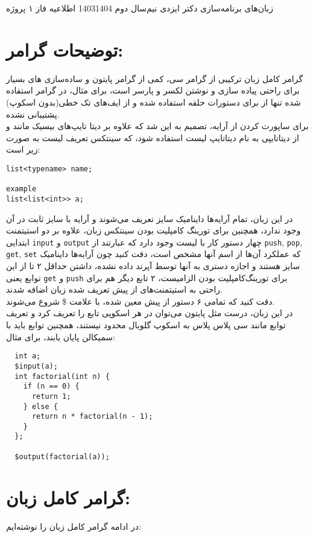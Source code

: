 \documentclass[a4paper,12pt]{article}
\begin{document}
\handout
{زبان‌های برنامه‌سازی}
{دکتر ایزدی}
{نیم‌سال دوم 1403\lr{-}1404}
{اطلاعیه}
{}
{}
{فاز ۱ پروژه}
\section{توضیحات گرامر:}
گرامر کامل زبان ترکیبی از گرامر سی، کمی از گرامر پایتون و ساده‌سازی های بسیار برای راحتی پیاده سازی و نوشتن لکسر و پارسر است، 
برای مثال، در گرامر استفاده شده تنها از 
برای دستورات حلقه استفاده شده و از ایف‌های تک خطی(بدون اسکوپ) پشتیبانی نشده.
\\
برای ساپورت کردن از آرایه، تصمیم به این شد که علاوه بر دیتا‌ تایپ‌های بیسیک مانند 
 و  از دیتاتایپی به نام دیتاتایپ لیست استفاده شود، 
که سینتکس تعریف لیست به صورت زیر است:
\begin{verbatim}
list<typename> name;

example
list<list<int>> a;
\end{verbatim}
در این زبان، تمام آرایه‌ها داینامیک سایز تعریف می‌شوند و آرایه با سایز ثابت در آن وجود ندارد، همچنین برای تورینگ کامپلیت بودن 
سینتکس زبان، علاوه بر دو استیتمنت ابتدایی 
\texttt{input}
و 
\texttt{output}
چهار دستور کار با لیست وجود دارد که عبارتند از
\texttt{push}, \texttt{pop}, \texttt{get}, \texttt{set}
که عملکرد آن‌ها از اسم آنها مشخص است، دقت کنید چون آرایه‌ها داینامیک سایز هستند 
و اجازه دستری به آنها توسط آپرند داده نشده، داشتن حداقل ۲ تا از این توابع یعنی 
\texttt{get}
و 
\texttt{push}
برای تورینگ‌کامپلیت بودن الزامیست، ۲ تابع دیگر هم برای راحتی به استیتمنت‌های از پیش تعریف شده زبان اضافه شدند.
\\
دقت کنید که تمامی ۶ دستور از پیش معین شده، با علامت 
\$
شروع می‌شوند.
\\
در این زبان، درست مثل پایتون می‌توان در هر اسکوپی تابع را تعریف کرد و تعریف توابع مانند سی پلاس پلاس به اسکوپ گلوبال محدود نیستند، همچنین توابع باید با سمیکالن 
پایان یابند، برای مثال:
\begin{verbatim}
  int a;
  $input(a);
  int factorial(int n) {
    if (n == 0) {
      return 1;
    } else {
      return n * factorial(n - 1);
    }
  };

  $output(factorial(a));
\end{verbatim}
\pagebreak
\section{گرامر کامل زبان:}
در ادامه گرامر کامل زبان را نوشته‌ایم:
\end{document}
